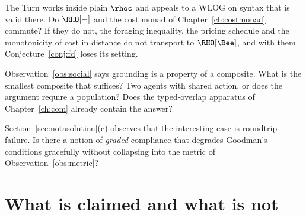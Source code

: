 \begin{question}
\label{q:monad}
The Turn works inside plain $\rhoc$ and appeals to a WLOG on syntax
that is valid there.
Do $\RHO[-]$ and the cost monad of Chapter~\ref{ch:costmonad}
commute?
If they do not, the foraging inequality, the pricing schedule and
the monotonicity of cost in distance do not transport to
$\RHO[\Bee]$, and with them Conjecture~\ref{conj:fd} loses its
setting.
\end{question}

\begin{question}
\label{q:social}
Observation~\ref{obs:social} says grounding is a property of a
composite.
What is the smallest composite that suffices?
Two agents with shared action, or does the argument require a
population?
Does the typed-overlap apparatus of Chapter~\ref{ch:com} already
contain the answer?
\end{question}

\begin{question}
\label{q:approx}
Section~\ref{sec:notasolution}(c) observes that the interesting
case is roundtrip failure.
Is there a notion of \emph{graded} compliance that degrades
Goodman's conditions gracefully without collapsing into the metric
of Observation~\ref{obs:metric}?
\end{question}

\section{What is claimed and what is not}
\label{sec:notation-claims}

